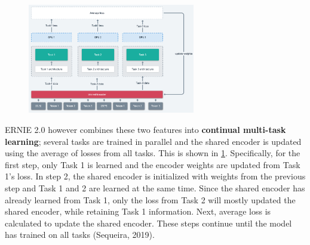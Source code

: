 \begin{program}
\begin{figure}
    \centering
    \includegraphics[width=0.65\textwidth]{imgs/ernie_continualMultitask.png}
\vspace{-5pt}
\vspace{-10pt}
\label{fig:ernie_continualMultitaskLearning}
\end{figure}

ERNIE 2.0 however combines these two features into \textbf{continual multi-task learning}; several tasks are trained in parallel and the shared encoder is updated using the average of losses from all tasks. This is shown in \cref{fig:ernie_continualMultitaskLearning}. Specifically, for the first step, only Task 1 is learned and the encoder weights are updated from Task 1's loss. In step 2, the shared encoder is initialized with weights from the previous step and Task 1 and 2 are learned at the same time. Since the shared encoder has already learned from Task 1, only the loss from Task 2 will mostly updated the shared encoder, while retaining Task 1 information. Next, average loss is calculated to update the shared encoder. These steps continue until the model has trained on all tasks (Sequeira, 2019). 

\end{program}

